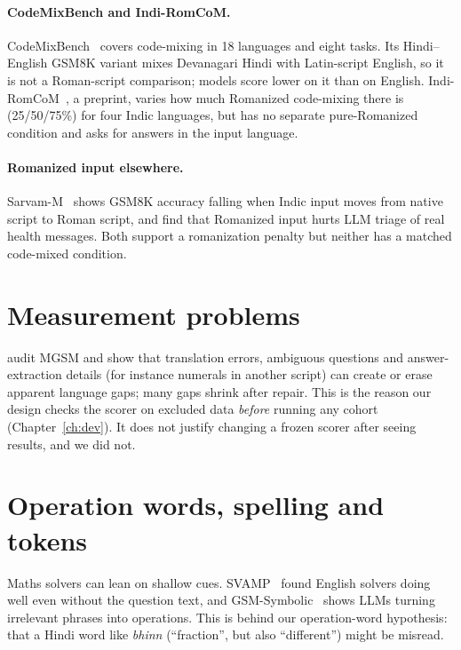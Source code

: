\documentclass[12pt,a4paper,oneside]{report}
\renewcommand{\_}{\oldunderscore\allowbreak}
\begin{document}
\paragraph{CodeMixBench and Indi-RomCoM.} CodeMixBench~\citep{yang-chai-2025-codemixbench} covers code-mixing in 18 languages and eight tasks. Its Hindi--English GSM8K variant mixes Devanagari Hindi with Latin-script English, so it is not a Roman-script comparison; models score lower on it than on English. Indi-RomCoM~\citep{das-etal-2026-indiromcom}, a preprint, varies how much Romanized code-mixing there is (25/50/75\%) for four Indic languages, but has no separate pure-Romanized condition and asks for answers in the input language.

\paragraph{Romanized input elsewhere.} Sarvam-M~\citep{sarvam-2025-sarvamm} shows GSM8K accuracy falling when Indic input moves from native script to Roman script, and \citet{khullar-etal-2026-script} find that Romanized input hurts LLM triage of real health messages. Both support a romanization penalty but neither has a matched code-mixed condition.

\section{Measurement problems}

\citet{peter-etal-2026-mind} audit MGSM and show that translation errors, ambiguous questions and answer-extraction details (for instance numerals in another script) can create or erase apparent language gaps; many gaps shrink after repair. This is the reason our design checks the scorer on excluded data \emph{before} running any cohort (Chapter~\ref{ch:dev}). It does not justify changing a frozen scorer after seeing results, and we did not.

\section{Operation words, spelling and tokens}

Maths solvers can lean on shallow cues. SVAMP~\citep{patel-etal-2021-nlp} found English solvers doing well even without the question text, and GSM-Symbolic~\citep{mirzadeh-etal-2025-gsmsymbolic} shows LLMs turning irrelevant phrases into operations. This is behind our operation-word hypothesis: that a Hindi word like \emph{bhinn} (``fraction'', but also ``different'') might be misread.
\end{document}
